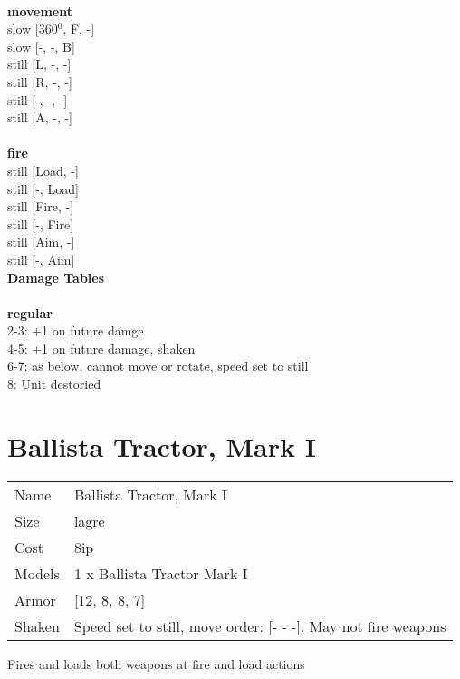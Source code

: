\ \\ {\bf movement } \\
slow [360$^0$, F, -] \\
slow [-, -, B] \\
still [L, -, -] \\
still [R, -, -] \\
still [-, -, -] \\
still [A, -, -] \\
\ \\ {\bf fire } \\
still [Load, -] \\
still [-, Load] \\
still [Fire, -] \\
still [-, Fire] \\
still [Aim, -] \\
still [-, Aim] \\


{\bf Damage Tables} \\
\ \\ {\bf regular } \\
2-3: +1 on future damge \\
4-5: +1 on future damage, shaken \\
6-7: as below, cannot move or rotate, speed set to still \\
8: Unit destoried \\










\pagebreak\pagebreak

\section{ Ballista Tractor, Mark I }

\begin{tabular}{ll}
  Name & Ballista Tractor, Mark I \\
  Size & lagre\\
  Cost & 8ip\\
  Models & 1 x Ballista Tractor Mark I\\
  Armor & [12, 8, 8, 7]\\
  Shaken & Speed set to still, move order: [- - -]. May not fire weapons\\
\end{tabular}

\noindent Fires and loads both weapons at fire and load actions\\ 


